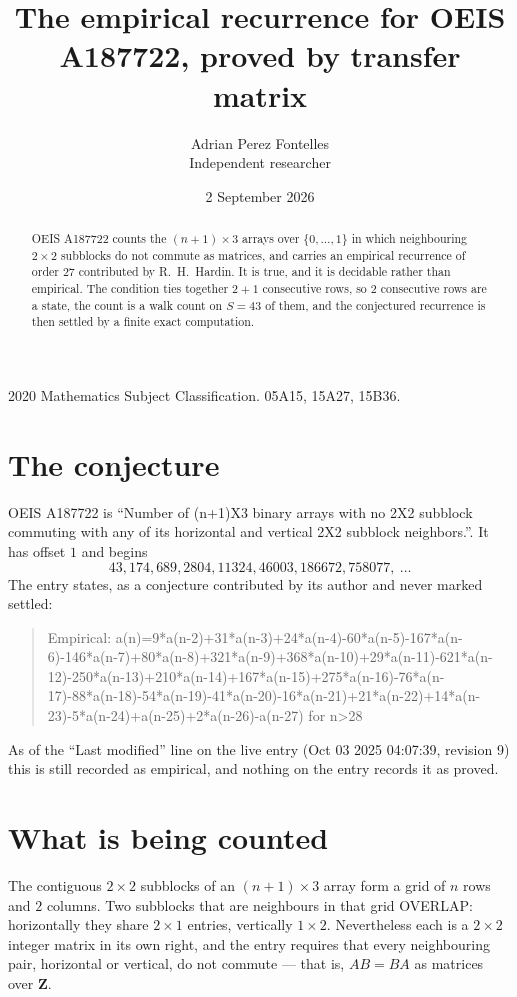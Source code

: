 \documentclass[11pt,a4paper]{article}
\title{The empirical recurrence for OEIS A187722, proved by transfer matrix}
\author{Adrian Perez Fontelles\\ \small Independent researcher}
\date{2 September 2026}
\theoremstyle{plain}
\theoremstyle{definition}
\begin{document}
\maketitle

\begin{abstract}
OEIS A187722 counts the $(n+1)\times3$ arrays over $\{0,\dots,1\}$ in which
neighbouring $2\times2$ subblocks do not commute as matrices, and carries an empirical recurrence
of order $27$ contributed by R.~H.~Hardin. It is true, and it is decidable rather than
empirical. The condition ties together $2+1$ consecutive rows, so $2$ consecutive rows are
a state, the count is a walk count on $S=43$ of them, and the conjectured recurrence is then
settled by a finite exact computation.
\end{abstract}

\noindent\small 2020 Mathematics Subject Classification. 05A15, 15A27, 15B36.\normalsize

\section{The conjecture}

OEIS A187722 is ``Number of (n+1)X3 binary arrays with no 2X2 subblock commuting with any of its horizontal and vertical 2X2 subblock neighbors.''. It has offset $1$ and begins
\[
43, 174, 689, 2804, 11324, 46003, 186672, 758077,\ \dots
\]
The entry states, as a conjecture contributed by its author and never marked settled:
\begin{quote}
Empirical: a(n)=9*a(n-2)+31*a(n-3)+24*a(n-4)-60*a(n-5)-167*a(n-6)-146*a(n-7)+80*a(n-8)+321*a(n-9)+368*a(n-10)+29*a(n-11)-621*a(n-12)-250*a(n-13)+210*a(n-14)+167*a(n-15)+275*a(n-16)-76*a(n-17)-88*a(n-18)-54*a(n-19)-41*a(n-20)-16*a(n-21)+21*a(n-22)+14*a(n-23)-5*a(n-24)+a(n-25)+2*a(n-26)-a(n-27) for n>28
\end{quote}
As of the ``Last modified'' line on the live entry (Oct 03 2025 04:07:39, revision 9) this is still
recorded as empirical, and nothing on the entry records it as proved.

\section{What is being counted}

The contiguous $2\times2$ subblocks of an $(n+1)\times3$ array form a grid of $n$
rows and $2$ columns. Two subblocks that are neighbours in that
grid OVERLAP: horizontally they share $2\times1$ entries, vertically
$1\times2$. Nevertheless each is a $2\times2$ integer matrix in its own right, and
the entry requires that every neighbouring pair, horizontal or vertical, do not commute --- that is,
$AB=BA$ as matrices over $\mathbf{Z}$.
\end{document}
